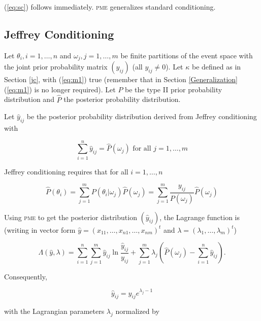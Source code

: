 \documentclass[entropy,article,submit,oneauthor,pdftex,12pt,a4paper]{mdpi}
\begin{document}
{\noindent}(\ref{eq:sc}) follows immediately. \textsc{pme} generalizes standard conditioning.

\subsection{Jeffrey Conditioning}
\label{jco}

Let $\theta_{i},i=1,\ldots,n$ and $\omega_{j},j=1,\ldots,m$ be finite
partitions of the event space with the joint prior probability matrix
$(y_{ij})$ (all $y_{ij}\neq{}0$). Let $\kappa$ be defined as in
Section \ref{jc}, with (\ref{eq:m1}) true (remember that in Section
\ref{Generalization} (\ref{eq:m1}) is no longer required). Let $P$ be
the type II prior probability distribution and $\hat{P}$ the posterior
probability distribution.

Let $\hat{y}_{ij}$ be the posterior probability distribution derived
from Jeffrey conditioning with

\begin{equation}
  \label{eq:jc1}
  \sum_{i=1}^{n}\hat{y}_{ij}=\hat{P}(\omega_{j})\mbox{ for all }j=1,\ldots,m
\end{equation}

{\noindent}Jeffrey conditioning requires that for all $i=1,\ldots,n$

\begin{equation}
  \label{eq:jc2}
  \hat{P}(\theta_{i})=\sum_{j=1}^{m}P(\theta_{i}|\omega_{j})\hat{P}(\omega_{j})=\sum_{j=1}^{m}\frac{y_{ij}}{P(\omega_{j})}\hat{P}(\omega_{j})
\end{equation}

{\noindent}Using \textsc{pme} to get the posterior distribution
$(\hat{y}_{ij})$, the Lagrange function is (writing in vector form
$\hat{y}=(x_{11},\ldots,x_{n1},\ldots,x_{nm})^{t}$ and
$\lambda=(\lambda_{1},\ldots,\lambda_{m})^{t}$)

\begin{equation}
  \label{eq:jclag}
  \Lambda(\hat{y},\lambda)=\sum_{i=1}^{n}\sum_{j=1}^{m}\hat{y}_{ij}\ln\frac{\hat{y}_{ij}}{y_{ij}}+\sum_{j=1}^{m}\lambda_{j}\left(\hat{P}(\omega_{j})-\sum_{i=1}^{n}\hat{y}_{ij}\right).
\end{equation}

{\noindent}Consequently,

\begin{equation}
  \label{eq:jc4}
  \hat{y}_{ij}=y_{ij}e^{\lambda_{j}-1}
\end{equation}

{\noindent}with the Lagrangian parameters $\lambda_{j}$ normalized by
\end{document}
